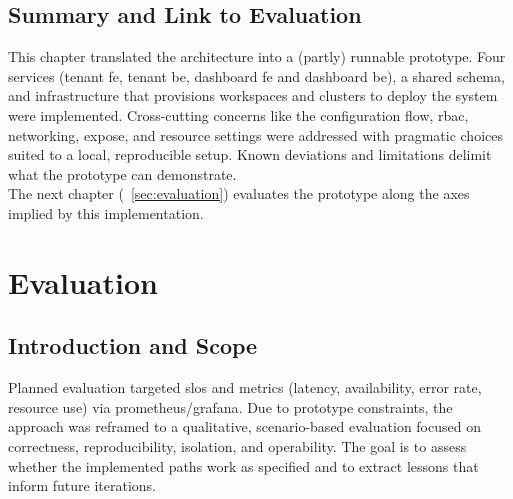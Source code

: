 \documentclass[11pt, a4paper, oneside, listof=totoc]{scrartcl}
\begin{document}
        \subsection{Summary and Link to Evaluation}\label{subsec:summaryAndLinkToEvaluation}
            This chapter translated the architecture into a (partly) runnable prototype.
            Four services (tenant \gls{fe}, tenant \gls{be}, dashboard \gls{fe} and dashboard
            \gls{be}), a shared schema, and infrastructure that provisions workspaces and clusters
            to deploy the system were implemented.
            Cross-cutting concerns like the configuration flow, \gls{rbac}, networking, expose, and
            resource settings were addressed with pragmatic choices suited to a local, reproducible
            setup.
            Known deviations and limitations delimit what the prototype can demonstrate.\\
            The next chapter (~\autoref{sec:evaluation}) evaluates the prototype along the axes
            implied by this implementation.

    \clearpage

    \section{Evaluation}\label{sec:evaluation}

        \subsection{Introduction and Scope}\label{subsec:introductionAndScope}
            Planned evaluation targeted \glspl{slo} and metrics (latency, availability, error rate,
            resource use) via \gls{prometheus}/\gls{grafana}.
            Due to prototype constraints, the approach was reframed to a qualitative, scenario-based
            evaluation focused on correctness, reproducibility, isolation, and operability.
            The goal is to assess whether the implemented paths work as specified and to extract
            lessons that inform future iterations.
\end{document}
